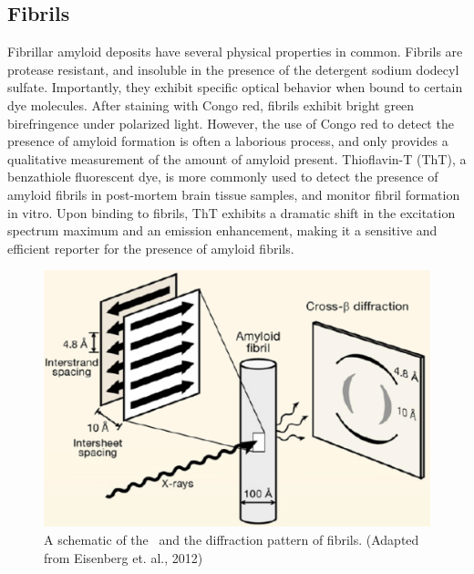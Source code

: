 
\subsection{Fibrils}

Fibrillar amyloid deposits have several physical properties in common. Fibrils are protease resistant, and insoluble in the presence of the detergent sodium dodecyl sulfate.\cite{Eisenberg:2012hm} Importantly, they exhibit specific optical behavior when bound to certain dye molecules. After staining with Congo red, fibrils exhibit bright green birefringence under polarized light. However, the use of Congo red to detect the presence of amyloid formation is often a laborious process, and only provides a qualitative measurement of the amount of amyloid present. Thioflavin-T (ThT), a benzathiole fluorescent dye, is more commonly used to detect the presence of amyloid fibrils in post-mortem brain tissue samples, and monitor fibril formation in vitro. Upon binding to fibrils, ThT exhibits a dramatic shift in the excitation spectrum maximum and an emission enhancement, making it a sensitive and efficient reporter for the presence of amyloid fibrils.

\begin{figure}
 \centering
 \includegraphics[width=5in]{figures/introduction/fibril_structure_diffraction.pdf}
 \caption[Characteristic cross-$\beta$ spacings from X-ray fibre diffraction studies of amyloid fibrils]{A schematic of the \crossbs\ and the diffraction pattern of fibrils. (Adapted from Eisenberg et. al., 2012)}
 \label{fig:fibril_diffraction}
\end{figure}

